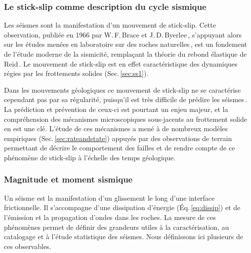 


\subsubsection{Le stick-slip comme description du cycle sismique}

Les séismes sont la manifestation d'un mouvement de stick-slip. Cette observation, publiée en 1966 par W.\,F.\,Brace et J.\,D.\,Byerlee\,\cite{brace_stick-slip_1966}, s'appuyant alors sur les études menées en laboratoire sur des roches naturelles\,\cite{jaeger_frictional_1959,uffen_stress_1963,griggs_observations_1960}, est un fondement de l'étude moderne de la sismicité, remplaçant la théorie du rebond élastique de Reid\,\cite{reid_mechanics_1910}. Le mouvement de stick-slip est en effet caractéristique des dynamiques régies par les frottements solides (Sec.\,\ref{sec:ss1}).

Dans les mouvements géologiques ce mouvement de stick-slip ne se caractérise cependant pas par sa régularité, puisqu'il est très difficile de prédire les séismes\,\cite{rikitake_earthquake_1968, mogi_earthquake_1985, geller_earthquake_1997, kanamori_earthquake_2003}. La prédiction et prévention de ceux-ci est pourtant un enjeu majeur, et la compréhension des mécanismes microscopiques sous-jacents au frottement solide en est une clé. L'étude de ces mécanismes a mené à de nombreux modèles empiriques (Sec.\,\ref{sec:rateandstate}) appuyés par des observations de terrain permettant de décrire le comportement des failles et de rendre compte de ce phénomène de stick-slip à l'échelle des temps géologique.


\subsubsection{Magnitude et moment sismique}

Un séisme est la manifestation d'un glissement le long d'une interface frictionnelle. Il s'accompagne d'une dissipation d'énergie (Éq.\,\ref{eq:dissip}) et de l'émission et la propagation d'ondes dans les roches. La mesure de ces phénomènes permet de définir des grandeurs utiles à la caractérisation, au catalogage et à l'étude statistique des séismes. Nous définissons ici plusieurs de ces observables.




